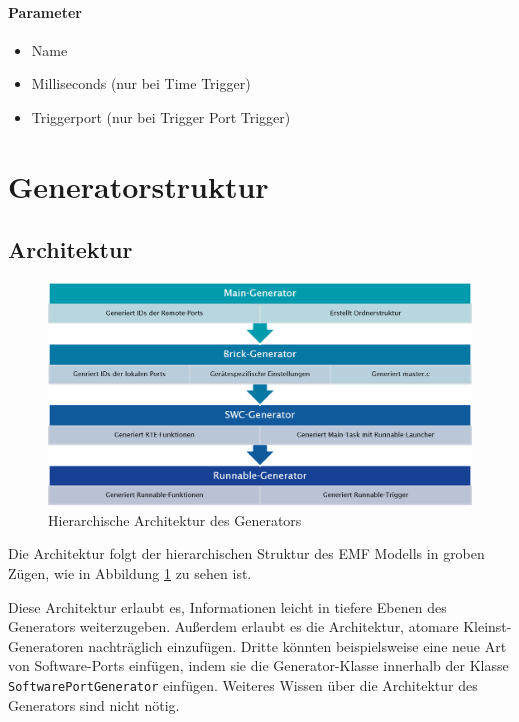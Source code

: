 \paragraph{Parameter}
\begin{itemize}
\item Name
\item Milliseconds (nur bei Time Trigger)
\item Triggerport (nur bei Trigger Port Trigger)
\end{itemize}









\section{Generatorstruktur}
\subsection{Architektur}

\begin{figure}[h]
	\centering
		\includegraphics[width=\textwidth]{Dokumente/generator_architektur}
	\caption{Hierarchische Architektur des Generators}
	\label{fig:hardwareaufbau}
\end{figure}

Die Architektur folgt der hierarchischen Struktur des EMF Modells in groben Zügen, wie in Abbildung \ref{fig:hardwareaufbau} zu sehen ist.

Diese Architektur erlaubt es, Informationen leicht in tiefere Ebenen des Generators weiterzugeben. Außerdem erlaubt es die Architektur, atomare Kleinst-Generatoren nachträglich einzufügen. Dritte könnten beispielsweise eine neue Art von Software-Ports einfügen, indem sie die Generator-Klasse innerhalb der Klasse \texttt{SoftwarePortGenerator} einfügen. Weiteres Wissen über die Architektur des Generators sind nicht nötig.

